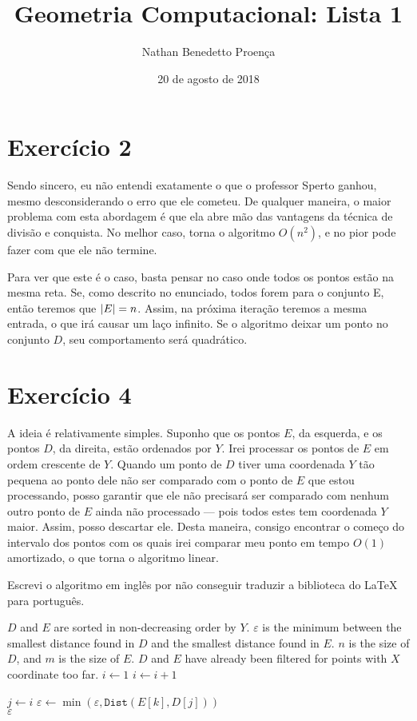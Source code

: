 \documentclass[10pt,reqno,a4paper]{article}
\title{Geometria Computacional: Lista 1}
\author{Nathan Benedetto Proença}
\date{20 de agosto de 2018}
\DeclarePairedDelimiter{\abs}{\lvert}{\rvert}
\newcommand{\eps}{\varepsilon}
\begin{document}
\maketitle

\section*{Exercício 2}
Sendo sincero, eu não entendi exatamente o que o professor Sperto ganhou,
mesmo desconsiderando o erro que ele cometeu. De qualquer maneira, o maior
problema com esta abordagem é que ela abre mão das vantagens da técnica de
divisão e conquista. No melhor caso, torna o algoritmo $O(n^2)$, e no
pior pode fazer com que ele não termine.

Para ver que este é o caso, basta pensar no caso onde todos os pontos estão
na mesma reta. Se, como descrito no enunciado, todos forem para o conjunto E,
então teremos que $\abs{E} = n$. Assim, na próxima iteração teremos a mesma
entrada, o que irá causar um laço infinito. Se o algoritmo deixar um ponto no
conjunto $D$, seu comportamento será quadrático.

\section*{Exercício 4}

A ideia é relativamente simples. Suponho que os pontos $E$, da esquerda,
e os pontos $D$, da direita, estão ordenados por $Y$. Irei processar
os pontos de $E$ em ordem crescente de $Y$. Quando um ponto de $D$ tiver uma
coordenada $Y$ tão pequena ao ponto dele não ser comparado com o ponto de $E$
que estou processando, posso garantir que ele não precisará ser comparado com
nenhum outro ponto de $E$ ainda não processado --- pois todos estes tem coordenada
$Y$ maior. Assim, posso descartar ele. Desta maneira, consigo encontrar o começo
do intervalo dos pontos com os quais irei comparar meu ponto em tempo $O(1)$
amortizado, o que torna o algoritmo linear.

Escrevi o algoritmo em inglês por não conseguir traduzir a biblioteca do
\LaTeX \; para português.
\\

\begin{algorithmic}
\Require $D$ and $E$ are sorted in non-decreasing order by $Y$.
\Require $\eps$ is the minimum between the smallest distance found in $D$
and the smallest distance found in $E$.
\Require $n$ is the size of $D$, and $m$ is the size of $E$.
\Require $D$ and $E$ have already been filtered for points with $X$ coordinate
too far.
\Function{Combine}{$X, Y, E, n, D, m, \eps$}
    \State $i \gets 1$
        \While{$i \leq m$ and $\eps < Y[E[k]] - Y[D[i]]$}
            \State $i \gets i + 1$
        \EndWhile

        \State $j \gets i$
        \While{$j \leq m$ and $\abs{Y[D[j]] - Y[E[k]]} < \eps$}
                \State $\eps \gets \min (\eps, \texttt{Dist}(E[k], D[j]))$
        \EndWhile
    \EndFor\\
    \Return $\eps$
\EndFunction
\end{algorithmic}
\end{document}
